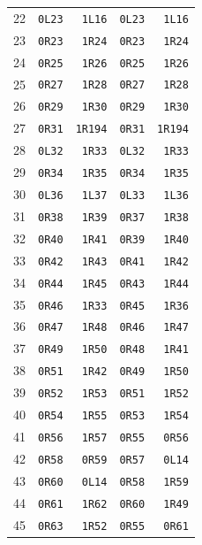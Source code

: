 \begin{longtable}{rrrrr}
22 & \texttt{0L23} & \texttt{1L16} & \texttt{0L23} & \texttt{1L16}\\
23 & \texttt{0R23} & \texttt{1R24} & \texttt{0R23} & \texttt{1R24}\\
24 & \texttt{0R25} & \texttt{1R26} & \texttt{0R25} & \texttt{1R26}\\
25 & \texttt{0R27} & \texttt{1R28} & \texttt{0R27} & \texttt{1R28}\\
26 & \texttt{0R29} & \texttt{1R30} & \texttt{0R29} & \texttt{1R30}\\
27 & \texttt{0R31} & \texttt{1R194} & \texttt{0R31} & \texttt{1R194}\\
28 & \texttt{0L32} & \texttt{1R33} & \texttt{0L32} & \texttt{1R33}\\
29 & \texttt{0R34} & \texttt{1R35} & \texttt{0R34} & \texttt{1R35}\\
30 & \texttt{0L36} & \texttt{1L37} & \texttt{0L33} & \texttt{1L36}\\
31 & \texttt{0R38} & \texttt{1R39} & \texttt{0R37} & \texttt{1R38}\\
32 & \texttt{0R40} & \texttt{1R41} & \texttt{0R39} & \texttt{1R40}\\
33 & \texttt{0R42} & \texttt{1R43} & \texttt{0R41} & \texttt{1R42}\\
34 & \texttt{0R44} & \texttt{1R45} & \texttt{0R43} & \texttt{1R44}\\
35 & \texttt{0R46} & \texttt{1R33} & \texttt{0R45} & \texttt{1R36}\\
36 & \texttt{0R47} & \texttt{1R48} & \texttt{0R46} & \texttt{1R47}\\
37 & \texttt{0R49} & \texttt{1R50} & \texttt{0R48} & \texttt{1R41}\\
38 & \texttt{0R51} & \texttt{1R42} & \texttt{0R49} & \texttt{1R50}\\
39 & \texttt{0R52} & \texttt{1R53} & \texttt{0R51} & \texttt{1R52}\\
40 & \texttt{0R54} & \texttt{1R55} & \texttt{0R53} & \texttt{1R54}\\
41 & \texttt{0R56} & \texttt{1R57} & \texttt{0R55} & \texttt{0R56}\\
42 & \texttt{0R58} & \texttt{0R59} & \texttt{0R57} & \texttt{0L14}\\
43 & \texttt{0R60} & \texttt{0L14} & \texttt{0R58} & \texttt{1R59}\\
44 & \texttt{0R61} & \texttt{1R62} & \texttt{0R60} & \texttt{1R49}\\
45 & \texttt{0R63} & \texttt{1R52} & \texttt{0R55} & \texttt{0R61}\\

\end{longtable}
